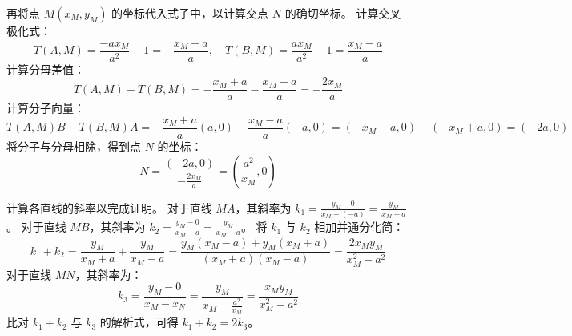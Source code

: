 \begin{solution}
再将点 $M(x_M, y_M)$ 的坐标代入式子中，以计算交点 $N$ 的确切坐标。
计算交叉极化式：
$$ T(A,M) = \frac{-a x_M}{a^2} - 1 = -\frac{x_M+a}{a}, \quad T(B,M) = \frac{a x_M}{a^2} - 1 = \frac{x_M-a}{a} $$
计算分母差值：
$$ T(A,M) - T(B,M) = -\frac{x_M+a}{a} - \frac{x_M-a}{a} = -\frac{2x_M}{a} $$
计算分子向量：
$$ T(A,M)B - T(B,M)A = -\frac{x_M+a}{a}(a,0) - \frac{x_M-a}{a}(-a,0) = (-x_M-a,0) - (-x_M+a,0) = (-2a,0) $$
将分子与分母相除，得到点 $N$ 的坐标：
$$ N = \frac{(-2a,0)}{-\frac{2x_M}{a}} = \left(\frac{a^2}{x_M}, 0\right) $$

计算各直线的斜率以完成证明。
对于直线 $MA$，其斜率为 $k_1 = \frac{y_M - 0}{x_M - (-a)} = \frac{y_M}{x_M+a}$。
对于直线 $MB$，其斜率为 $k_2 = \frac{y_M - 0}{x_M - a} = \frac{y_M}{x_M-a}$。
将 $k_1$ 与 $k_2$ 相加并通分化简：
$$ k_1 + k_2 = \frac{y_M}{x_M+a} + \frac{y_M}{x_M-a} = \frac{y_M(x_M-a) + y_M(x_M+a)}{(x_M+a)(x_M-a)} = \frac{2x_M y_M}{x_M^2 - a^2} $$
对于直线 $MN$，其斜率为：
$$ k_3 = \frac{y_M - 0}{x_M - x_N} = \frac{y_M}{x_M - \frac{a^2}{x_M}} = \frac{x_M y_M}{x_M^2 - a^2} $$
比对 $k_1+k_2$ 与 $k_3$ 的解析式，可得 $k_1 + k_2 = 2k_3$。

\end{solution}

